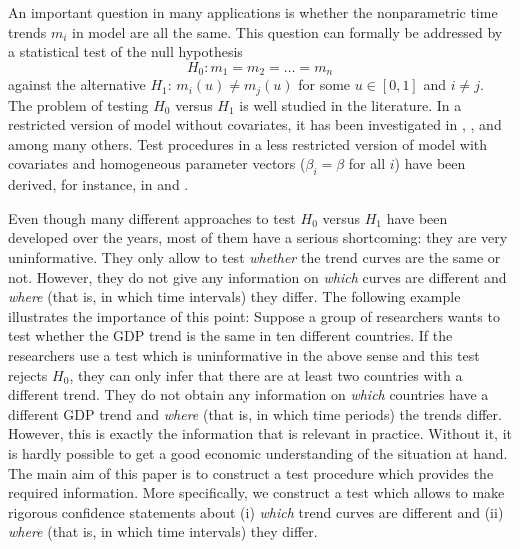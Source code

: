 \documentclass[a4paper,12pt]{article}
\makeatletter
\renewcommand{\eqref}[1]{\tagform@{\ref{#1}}}
\makeatother
\begin{document}
An important question in many applications is whether the nonparametric time trends $m_i$ in model \eqref{eq:model} are all the same. This question can formally be addressed by a statistical test of the null hypothesis 
\[ H_0: m_1 = m_2 = \ldots = m_n \]
against the alternative $H_1$: $m_i (u) \neq m_j(u)$ for some $u \in [0,1]$ and $i \ne j$. The problem of testing $H_0$ versus $H_1$ is well studied in the literature. In a restricted version of model \eqref{eq:model} without covariates, it has been investigated in \cite{HaerdleMarron1990}, \cite{Hall1990}, \cite{DegrasWu2012} and \cite{ChenWu2018} among many others. Test procedures in a less restricted version of model \eqref{eq:model} with covariates and homogeneous parameter vectors ($\beta_i = \beta$ for all $i$) have been derived, for instance, in \cite{Zhang2012} and \cite{Hidalgo2014}.


Even though many different approaches to test $H_0$ versus $H_1$ have been developed over the years, most of them have a serious shortcoming: they are very uninformative. They only allow to test \textit{whether} the trend curves are the same or not. However, they do not give any information on \textit{which} curves are different and \textit{where} (that is, in which time intervals) they differ. The following example illustrates the importance of this point: Suppose a group of researchers wants to test whether the GDP trend is the same in ten different countries. If the researchers use a test which is uninformative in the above sense and this test rejects $H_0$, they can only infer that there are at least two countries with a different trend. They do not obtain any information on \textit{which} countries have a different GDP trend and \textit{where} (that is, in which time periods) the trends differ. However, this is exactly the information that is relevant in practice. Without it, it is hardly possible to get a good economic understanding of the situation at hand. The main aim of this paper is to construct a test procedure which provides the required information. More specifically, we construct a test which allows to make rigorous confidence statements about (i) \textit{which} trend curves are different and (ii) \textit{where} (that is, in which time intervals) they differ. 
\end{document}
